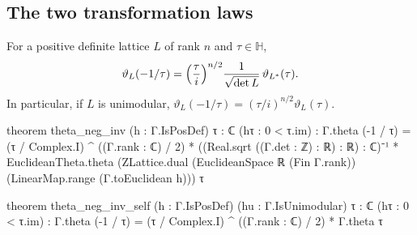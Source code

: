 \subsection{The two transformation laws}

\begin{theorem}\label{ch02:thm:thetaS}
For a positive definite lattice $L$ of rank $n$ and $\tau\in\mathbb{H}$,
\begin{equation*}
\vartheta_L(-1/\tau)=\Bigl(\frac\tau i\Bigr)^{n/2}\frac1{\sqrt{\det L}}\,\vartheta_{L^*}(\tau).
\end{equation*}
In particular, if $L$ is unimodular, $\vartheta_L(-1/\tau)=(\tau/i)^{n/2}\vartheta_L(\tau)$.
\end{theorem}
\begin{leancode}
theorem theta_neg_inv (h : Γ.IsPosDef) {τ : ℂ} (hτ : 0 < τ.im) :
    Γ.theta (-1 / τ)
      = (τ / Complex.I) ^ ((Γ.rank : ℂ) / 2)
        * ((Real.sqrt ((Γ.det : ℤ) : ℝ) : ℝ) : ℂ)⁻¹
        * EuclideanTheta.theta
            (ZLattice.dual (EuclideanSpace ℝ (Fin Γ.rank))
              (LinearMap.range (Γ.toEuclidean h))) τ

theorem theta_neg_inv_self (h : Γ.IsPosDef) (hu : Γ.IsUnimodular) {τ : ℂ} (hτ : 0 < τ.im) :
    Γ.theta (-1 / τ) = (τ / Complex.I) ^ ((Γ.rank : ℂ) / 2) * Γ.theta τ
\end{leancode}
